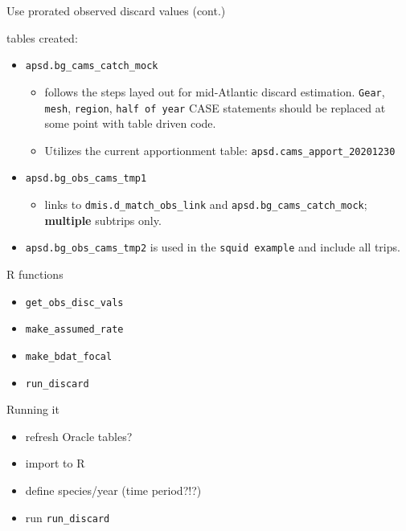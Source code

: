 \documentclass[
  ignorenonframetext,
]{beamer}
\providecommand{\tightlist}{%
  \setlength{\itemsep}{0pt}\setlength{\parskip}{0pt}}
\begin{document}
\begin{frame}[fragile]{Use prorated observed discard values (cont.)}
\protect\hypertarget{use-prorated-observed-discard-values-cont.}{}

tables created:

\begin{itemize}
\tightlist
\item
  \texttt{apsd.bg\_cams\_catch\_mock}

  \begin{itemize}
  \tightlist
  \item
    follows the steps layed out for mid-Atlantic discard estimation.
    \texttt{Gear}, \texttt{mesh}, \texttt{region},
    \texttt{half\ of\ year} CASE statements should be replaced at some
    point with table driven code.\\
  \item
    Utilizes the current apportionment table:
    \texttt{apsd.cams\_apport\_20201230}
  \end{itemize}
\item
  \texttt{apsd.bg\_obs\_cams\_tmp1}

  \begin{itemize}
  \tightlist
  \item
    links to \texttt{dmis.d\_match\_obs\_link} and
    \texttt{apsd.bg\_cams\_catch\_mock}; \textbf{multiple} subtrips
    only. 
  \end{itemize}
\item
  \texttt{apsd.bg\_obs\_cams\_tmp2} is used in the
  \texttt{squid\ example} and include all trips.
\end{itemize}

\end{frame}

\begin{frame}[fragile]{R functions}
\protect\hypertarget{r-functions}{}

\begin{itemize}
\tightlist
\item
  \texttt{get\_obs\_disc\_vals}
\item
  \texttt{make\_assumed\_rate}
\item
  \texttt{make\_bdat\_focal}
\item
  \texttt{run\_discard}
\end{itemize}

\end{frame}

\begin{frame}[fragile]{Running it}
\protect\hypertarget{running-it}{}

\begin{itemize}
\tightlist
\item
  refresh Oracle tables?
\item
  import to R
\item
  define species/year (time period?!?)
\item
  run \texttt{run\_discard}
\end{itemize}

\end{frame}
\end{document}
